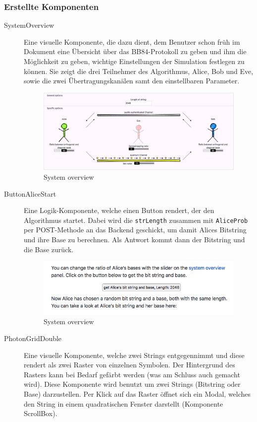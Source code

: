 \documentclass[a4paper,10.2pt,pdftex]{scrartcl}%
\begin{document}
\subsubsection{Erstellte Komponenten} 
\begin{description}
\item[SystemOverview] Eine visuelle Komponente, die dazu dient, dem Benutzer schon früh im Dokument eine Übersicht über das BB84-Protokoll zu geben und ihm die Möglichkeit zu geben, wichtige Einstellungen der Simulation festlegen zu können. Sie zeigt die drei Teilnehmer des Algorithmus, Alice, Bob und Eve, sowie die zwei Übertragungskanälen samt den einstellbaren Parameter.
\begin{figure}[h]
	\centering
  \includegraphics[width=\textwidth]{graphics/component_system_overview.png}
	\caption{System overview}
\end{figure}
\item[ButtonAliceStart] Eine Logik-Komponente, welche einen Button rendert, der den Algorithmus startet. Dabei wird die \texttt{strLength} zusammen mit \texttt{AliceProb} per POST-Methode an das Backend geschickt, um damit Alices Bitstring und ihre Base zu berechnen. Als Antwort kommt dann der Bitstring und die Base zurück.
\begin{figure}[h]
	\centering
  \includegraphics[width=\textwidth]{graphics/component_button_alice_start.png}
	\caption{System overview}
\end{figure}
\item[PhotonGridDouble] Eine visuelle Komponente, welche zwei Strings entgegennimmt und diese rendert als zwei Raster von einzelnen Symbolen. Der Hintergrund des Rasters kann bei Bedarf gefärbt werden (was am Schluss auch gemacht wird). Diese Komponente wird benutzt um zwei Strings (Bitstring oder Base) darzustellen. Per Klick auf das Raster öffnet sich ein Modal, welches den String in einem quadratischen Fenster darstellt (Komponente ScrollBox). 

\end{description}
\end{document}
